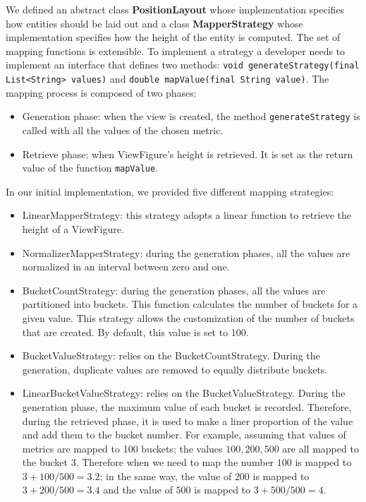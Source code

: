 We defined an abstract class \textbf{PositionLayout} whose implementation specifies how entities should be laid out and a class \textbf{MapperStrategy} whose implementation specifies how the height of the entity is computed. The set of mapping functions is extensible. To implement a strategy a developer needs to implement an interface that defines two methods: \texttt{void generateStrategy(final List<String> values)} and \texttt{double mapValue(final String value)}. The mapping process is composed of two phases:
\begin{itemize}
    \item Generation phase: when the view is created, the method \texttt{generateStrategy} is called with all the values of the chosen metric. 
    \item Retrieve phase: when ViewFigure's height is retrieved. It is set as the return value of the function \texttt{mapValue}. 
\end{itemize}
\noindent
In our initial implementation, we provided five different mapping strategies:
\begin{itemize}
    \item LinearMapperStrategy: this strategy adopts a linear function to retrieve the height of a ViewFigure. 
    \item NormalizerMapperStrategy: during the generation phases, all the values are normalized in an interval between zero and one.

    \item BucketCountStrategy: during the generation phases, all the values are partitioned into buckets. This function calculates the number of buckets for a given value. This strategy allows the customization of the number of buckets that are created. By default, this value is set to 100. 
    \item BucketValueStrategy: relies on the BucketCountStrategy. During the generation, duplicate values are removed to equally distribute buckets.

    \item LinearBucketValueStrategy: relies on the BucketValueStrategy. During the generation phase, the maximum value of each bucket is recorded. Therefore, during the retrieved phase, it is used to make a liner proportion of the value and add them to the bucket number. For example, assuming that values of metrics are mapped to 100 buckets; the values $100, 200, 500$ are all mapped to the bucket $3$. Therefore when we need to map the number $100$ is mapped to $3 + 100/500 = 3.2$; in the same way, the value of $200$ is mapped to $3 + 200/500 = 3.4$ and the value of $500$ is mapped to $3 + 500/500 = 4$.
\end{itemize}



